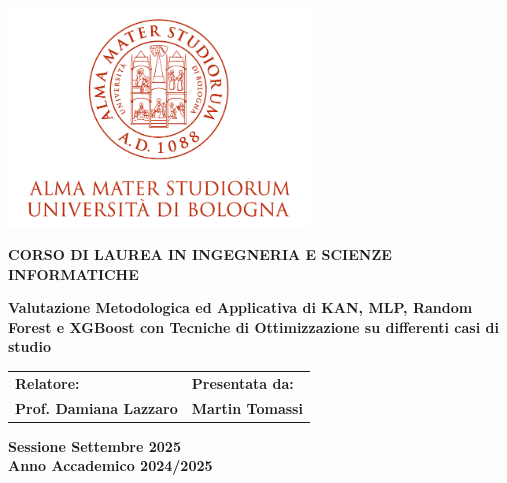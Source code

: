 \documentclass[a4paper,12pt]{report}
\begin{document}
	
	\begin{titlepage}
		\begin{center}
			\includegraphics[width=0.6\textwidth]{img/logo_unibo.png}
		\end{center}
		\begin{center}
			\vspace{2cm}
			\textbf{CORSO DI LAUREA IN INGEGNERIA E SCIENZE INFORMATICHE}
			
			\vspace{2cm}
			\textbf{\Large Valutazione Metodologica ed Applicativa di KAN, MLP, Random Forest e XGBoost con Tecniche di Ottimizzazione su differenti casi di studio}
			
			\vspace{2cm}
			\begin{tabular}{p{0.8\textwidth} p{}}
				\textbf{Relatore:} & \textbf{Presentata da:} \\
				\textbf{Prof. Damiana Lazzaro} & \textbf{Martin Tomassi} \\
			\end{tabular}
			
			\vspace{2cm}
			\textbf{Sessione Settembre 2025} \\
			\textbf{Anno Accademico 2024/2025}
		\end{center}
	\end{titlepage}
	
	\tableofcontents
	
\end{document}
